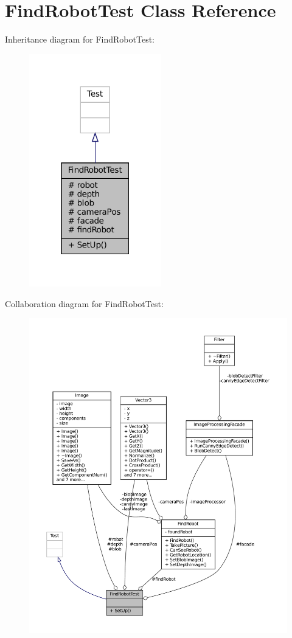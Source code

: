 \hypertarget{classFindRobotTest}{}\section{Find\+Robot\+Test Class Reference}
\label{classFindRobotTest}


Inheritance diagram for Find\+Robot\+Test\+:\nopagebreak
\begin{figure}[H]
\begin{center}
\leavevmode
\includegraphics[width=163pt]{classFindRobotTest__inherit__graph}
\end{center}
\end{figure}


Collaboration diagram for Find\+Robot\+Test\+:\nopagebreak
\begin{figure}[H]
\begin{center}
\leavevmode
\includegraphics[width=350pt]{classFindRobotTest__coll__graph}
\end{center}
\end{figure}
